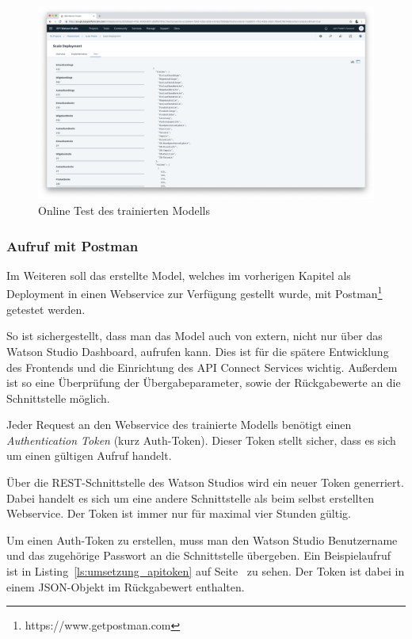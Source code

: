 \begin{figure}[h]
    \centering
    \includegraphics[width=\textwidth]{images/kapitel_3/deployment_test.png}
    \caption{Online Test des trainierten Modells}
    \label{fig:umsetzung_deployment_test}
\end{figure}

\subsubsection{Aufruf mit Postman}
\label{subsec:Aufruf mit Postman}
Im Weiteren soll das erstellte Model, welches im vorherigen Kapitel als Deployment in einen Webservice zur Verfügung
gestellt wurde, mit Postman\footnote{https://www.getpostman.com} getestet werden.

So ist sichergestellt, dass man das Model auch von extern, nicht nur über das Watson Studio Dashboard, aufrufen kann.
Dies ist für die spätere Entwicklung des Frontends und die Einrichtung des API Connect Services wichtig. Außerdem ist
so eine Überprüfung der Übergabeparameter, sowie der Rückgabewerte an die Schnittstelle möglich.

Jeder Request an den Webservice des trainierte Modells benötigt einen \textit{Authentication Token} (kurz Auth-Token).
Dieser Token stellt sicher, dass es sich um einen gültigen Aufruf handelt.

Über die REST-Schnittstelle des Watson Studios wird ein neuer Token generriert. Dabei handelt es sich um eine andere
Schnittstelle als beim selbst erstellten Webservice. Der Token ist immer nur für maximal vier Stunden gültig.

Um einen Auth-Token zu erstellen, muss man den Watson Studio Benutzername und das zugehörige Passwort an die
Schnittstelle übergeben. Ein Beispielaufruf ist in Listing~\ref{ls:umsetzung_apitoken} auf
Seite~\pageref{ls:umsetzung_apitoken} zu sehen. Der Token ist dabei in einem JSON-Objekt im Rückgabewert enthalten.

